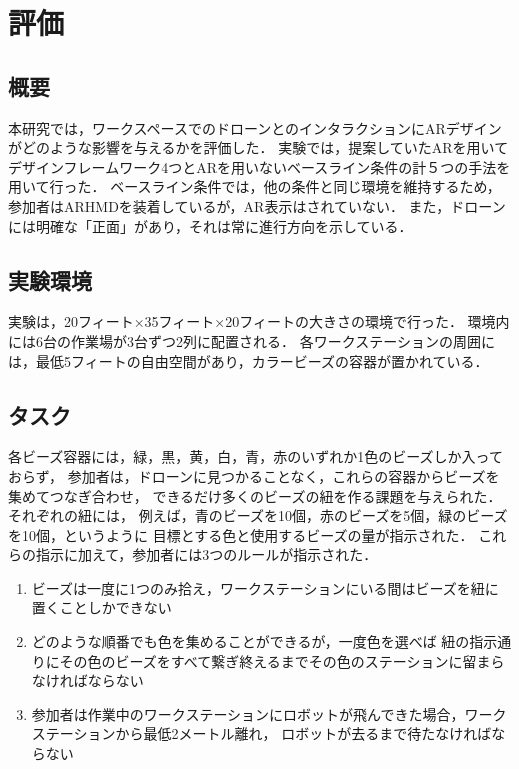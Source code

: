 \documentclass[a4paper,10pt,twocolumn,uplatex]{jsarticle}
\begin{document}

\section{評価}\label{experiment}
\subsection{概要}
本研究では，ワークスペースでのドローンとのインタラクションにARデザインがどのような影響を与えるかを評価した．
実験では，提案していたARを用いてデザインフレームワーク4つとARを用いないベースライン条件の計５つの手法を用いて行った．
ベースライン条件では，他の条件と同じ環境を維持するため，参加者はARHMDを装着しているが，AR表示はされていない．
また，ドローンには明確な「正面」があり，それは常に進行方向を示している．


\subsection{実験環境}
実験は，20フィート×35フィート×20フィートの大きさの環境で行った．
環境内には6台の作業場が3台ずつ2列に配置される．
各ワークステーションの周囲には，最低5フィートの自由空間があり，カラービーズの容器が置かれている．

\subsection{タスク}
各ビーズ容器には，緑，黒，黄，白，青，赤のいずれか1色のビーズしか入っておらず，
参加者は，ドローンに見つかることなく，これらの容器からビーズを集めてつなぎ合わせ，
できるだけ多くのビーズの紐を作る課題を与えられた．
それぞれの紐には，
例えば，青のビーズを10個，赤のビーズを5個，緑のビーズを10個，というように
目標とする色と使用するビーズの量が指示された．
これらの指示に加えて，参加者には3つのルールが指示された．
\begin{enumerate} %
  \item ビーズは一度に1つのみ拾え，ワークステーションにいる間はビーズを紐に置くことしかできない
  \item どのような順番でも色を集めることができるが，一度色を選べば
        紐の指示通りにその色のビーズをすべて繋ぎ終えるまでその色のステーションに留まらなければならない
  \item 参加者は作業中のワークステーションにロボットが飛んできた場合，ワークステーションから最低2メートル離れ，
        ロボットが去るまで待たなければならない
\end{enumerate}
\end{document}
